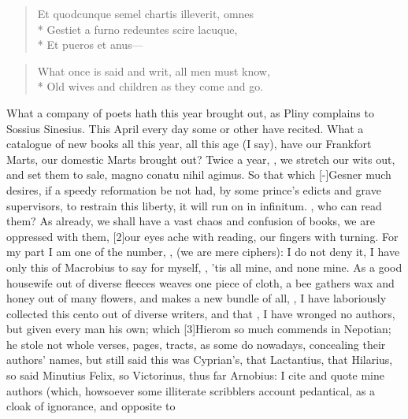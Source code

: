 {\begin{verse}
\textlatin{Et quodcunque semel chartis illeverit, omnes}\\*
\textlatin{Gestiet a furno redeuntes scire lacuque,}\\*
\textlatin{Et pueros et anus}---
\end{verse}

\begin{verse}
What once is said and writ, all men must know,\\*
Old wives and children as they come and go.
\end{verse}

What a company of poets hath this year brought out, as Pliny complains
to Sossius Sinesius. This April every day some or other have
recited. What a catalogue of new books all this year, all this age (I
say), have our Frankfort Marts, our domestic Marts brought out? Twice a
year,  , we stretch our wits
out, and set them to sale, magno conatu nihil agimus. So that which
[-\baselineskip]Gesner much desires, if a speedy reformation be not had, by some
prince's edicts and grave supervisors, to restrain this liberty, it
will run on in infinitum. , who can read
them? As already, we shall have a vast chaos and confusion of books, we
are oppressed with them, [2\baselineskip]our eyes ache with reading, our
fingers with turning. For my part I am one of the number, , (we are mere ciphers): I do not deny it, I have only this of
Macrobius to say for myself, , 'tis all mine, and
none mine. As a good housewife out of diverse fleeces weaves one piece
of cloth, a bee gathers wax and honey out of many flowers, and makes a
new bundle of all, , I have
laboriously collected this cento out of diverse writers, and that
, I have wronged no authors, but given every man his own;
which [3\baselineskip]Hierom so much commends in Nepotian; he stole not whole
verses, pages, tracts, as some do nowadays, concealing their authors'
names, but still said this was Cyprian's, that Lactantius, that
Hilarius, so said Minutius Felix, so Victorinus, thus far Arnobius: I
cite and quote mine authors (which, howsoever some illiterate
scribblers account pedantical, as a cloak of ignorance, and opposite to
}
